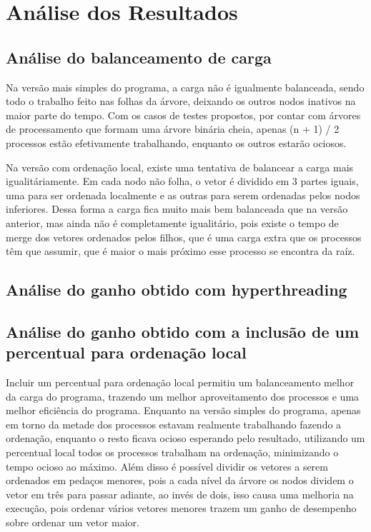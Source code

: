 \section{Análise dos Resultados}

\subsection{Análise do balanceamento de carga}

Na versão mais simples do programa, a carga não é igualmente balanceada, sendo todo o trabalho feito nas folhas da árvore, deixando os outros nodos inativos na maior parte do tempo. Com os casos de testes propostos, por contar com árvores de processamento que formam uma árvore binária cheia, apenas (n + 1) / 2 processos estão efetivamente trabalhando, enquanto os outros estarão ociosos.

Na versão com ordenação local, existe uma tentativa de balancear a carga mais igualitáriamente. Em cada nodo não folha, o vetor é dividido em 3 partes iguais, uma para ser ordenada localmente e as outras para serem ordenadas pelos nodos inferiores. Dessa forma a carga fica muito mais bem balanceada que na versão anterior, mas ainda não é completamente igualitário, pois existe o tempo de merge dos vetores ordenados pelos filhos, que é uma carga extra que os processos têm que assumir, que é maior o mais próximo esse processo se encontra da raíz.

\subsection{Análise do ganho obtido com hyperthreading}



\subsection{Análise do ganho obtido com a inclusão de um percentual para ordenação local}

Incluir um percentual para ordenação local permitiu um balanceamento melhor da carga do programa, trazendo um melhor aproveitamento dos processos e uma melhor eficiência do programa. Enquanto na versão simples do programa, apenas em torno da metade dos processos estavam realmente trabalhando fazendo a ordenação, enquanto o resto ficava ocioso esperando pelo resultado, utilizando um percentual local todos os processos trabalham na ordenação, minimizando o tempo ocioso ao máximo. Além disso é possível dividir os vetores a serem ordenados em pedaços menores, pois a cada nível da árvore os nodos dividem o vetor em três para passar adiante, ao invés de dois, isso causa uma melhoria na execução, pois ordenar vários vetores menores trazem um ganho de desempenho sobre ordenar um vetor maior.